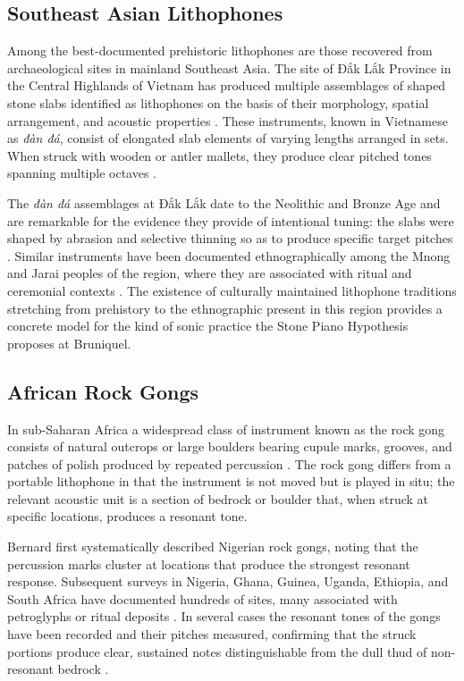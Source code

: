 \documentclass[12pt]{article}
\begin{document}
\subsection{Southeast Asian Lithophones}

Among the best-documented prehistoric lithophones are those recovered from archaeological sites in mainland Southeast Asia. The site of Đắk Lắk Province in the Central Highlands of Vietnam has produced multiple assemblages of shaped stone slabs identified as lithophones on the basis of their morphology, spatial arrangement, and acoustic properties \citep{Schafer1966, Condominas1952}. These instruments, known in Vietnamese as \textit{đàn đá}, consist of elongated slab elements of varying lengths arranged in sets. When struck with wooden or antler mallets, they produce clear pitched tones spanning multiple octaves \citep{Bezacier1972}.

The \textit{đàn đá} assemblages at Đắk Lắk date to the Neolithic and Bronze Age and are remarkable for the evidence they provide of intentional tuning: the slabs were shaped by abrasion and selective thinning so as to produce specific target pitches \citep{Schafer1966}. Similar instruments have been documented ethnographically among the Mnong and Jarai peoples of the region, where they are associated with ritual and ceremonial contexts \citep{Condominas1952}. The existence of culturally maintained lithophone traditions stretching from prehistory to the ethnographic present in this region provides a concrete model for the kind of sonic practice the Stone Piano Hypothesis proposes at Bruniquel.

\subsection{African Rock Gongs}

In sub-Saharan Africa a widespread class of instrument known as the rock gong consists of natural outcrops or large boulders bearing cupule marks, grooves, and patches of polish produced by repeated percussion \citep{Fagg1956, Kilson1971}. The rock gong differs from a portable lithophone in that the instrument is not moved but is played in situ; the relevant acoustic unit is a section of bedrock or boulder that, when struck at specific locations, produces a resonant tone.

Bernard \citet{Fagg1956} first systematically described Nigerian rock gongs, noting that the percussion marks cluster at locations that produce the strongest resonant response. Subsequent surveys in Nigeria, Ghana, Guinea, Uganda, Ethiopia, and South Africa have documented hundreds of sites, many associated with petroglyphs or ritual deposits \citep{Kilson1971, Coles1993}. In several cases the resonant tones of the gongs have been recorded and their pitches measured, confirming that the struck portions produce clear, sustained notes distinguishable from the dull thud of non-resonant bedrock \citep{Coles1993}.
\end{document}
